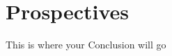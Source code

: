\documentclass[./dissertation.tex]{subfiles}
\begin{document}
    \chapter{Prospectives}
    This is where your Conclusion will go
\end{document}
